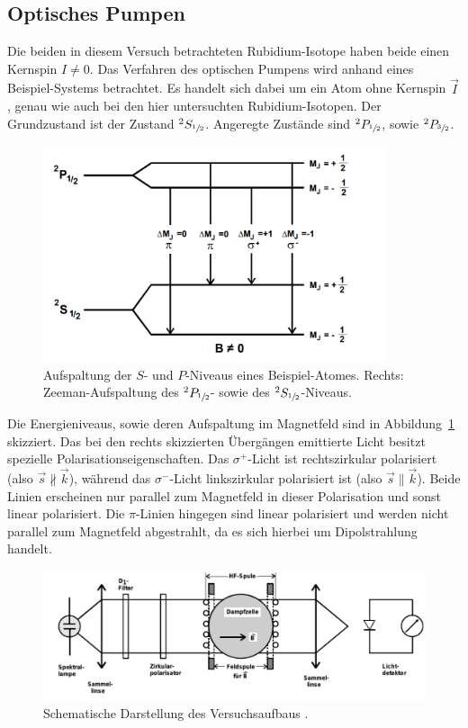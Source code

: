 \documentclass[
  bibliography=totoc,     %
  captions=tableheading,  %
  titlepage=firstiscover, %
]{scrartcl}
\begin{document}
\subsection{Optisches Pumpen}
%
Die beiden in diesem Versuch betrachteten Rubidium-Isotope haben beide einen
Kernspin $I \neq 0$. Das Verfahren des optischen Pumpens wird anhand eines Beispiel-Systems
betrachtet. Es handelt sich dabei um ein Atom ohne Kernspin $\vec{I}$, genau wie
auch bei den hier untersuchten Rubidium-Isotopen. Der
Grundzustand ist der Zustand $^2S_{\sfrac{1}{2}}$. Angeregte Zustände sind
$^2P_{\sfrac{1}{2}}$, sowie $^2P_{\sfrac{3}{2}}$.
%
\begin{figure}[htb]
  \centering
  \includegraphics[width=0.9\textwidth]{Beispiel.jpg}
  \caption{Aufspaltung der $S$- und $P$-Niveaus eines Beispiel-Atomes. Rechts:
  Zeeman-Aufspaltung des $^2P_{\sfrac{1}{2}}$- sowie des
  $^2S_{\sfrac{1}{2}}$-Niveaus. \cite{anleitung}}
  \label{fig:beispiel}
\end{figure}
\noindent
Die Energieniveaus, sowie deren Aufspaltung im Magnetfeld sind in
Abbildung~\ref{fig:beispiel} skizziert. Das bei den rechts skizzierten
Übergängen emittierte Licht besitzt spezielle Polarisationseigenschaften. Das
$\sigma^+$-Licht ist rechtszirkular polarisiert (also
$\vec{s}\nparallel\vec{k}$), während das $\sigma^-$-Licht linkszirkular
polarisiert ist (also $\vec{s}\parallel\vec{k}$). Beide Linien erscheinen nur
parallel zum Magnetfeld in dieser Polarisation und sonst linear polarisiert.
Die $\pi$-Linien hingegen sind linear polarisiert und werden nicht parallel zum
Magnetfeld abgestrahlt, da es sich hierbei um Dipolstrahlung handelt.
%
\begin{figure}[htb]
  \centering
  \includegraphics[width=\textwidth]{Versuchsaufbau.pdf}
  \caption{Schematische Darstellung des Versuchsaufbaus \cite{anleitung}.}
  \label{fig:aufbau}
\end{figure}
\end{document}

